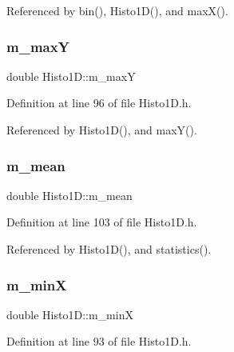 Referenced by bin(), Histo1\+D(), and max\+X().

\mbox{\label{classHisto1D_a28a8995424e36088c47643f8c1a7fa7f}} 
\subsubsection{\texorpdfstring{m\+\_\+maxY}{m\_maxY}}
{\footnotesize\ttfamily double Histo1\+D\+::m\+\_\+maxY\hspace{0.3cm}{\ttfamily [private]}}



Definition at line 96 of file Histo1\+D.\+h.



Referenced by Histo1\+D(), and max\+Y().

\mbox{\label{classHisto1D_a7e49893543fb5d2af37167690bc0b0ff}} 
\subsubsection{\texorpdfstring{m\+\_\+mean}{m\_mean}}
{\footnotesize\ttfamily double Histo1\+D\+::m\+\_\+mean\hspace{0.3cm}{\ttfamily [private]}}



Definition at line 103 of file Histo1\+D.\+h.



Referenced by Histo1\+D(), and statistics().

\mbox{\label{classHisto1D_af5ce58b20e96fa6e4b306109dd88589e}} 
\subsubsection{\texorpdfstring{m\+\_\+minX}{m\_minX}}
{\footnotesize\ttfamily double Histo1\+D\+::m\+\_\+minX\hspace{0.3cm}{\ttfamily [private]}}



Definition at line 93 of file Histo1\+D.\+h.



